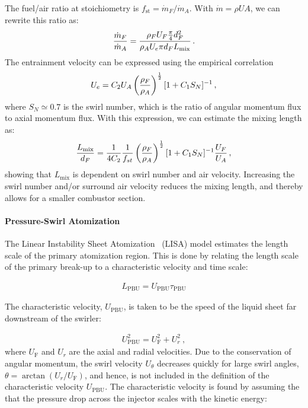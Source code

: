 The fuel/air ratio at stoichiometry is $f_\text{st} = \dot{m}_F/\dot{m}_A$. With $\dot{m} = \rho UA$, we can rewrite this ratio as:
\[
{\frac{\dot{m}_F}{\dot{m}_A}} = {\frac{\rho_F U_F {\frac{\pi}{4}} d_F^2}{\rho_A U_e \pi d_F L_\text{mix}}}\,.
\]
The entrainment velocity can be expressed using the empirical correlation
\begin{equation}
  U_e = C_2 U_A \left({\frac{\rho_F}{\rho_A}}\right)^{\frac{1}{2}} [1+C_1 S_N]^{-1}\,,
\end{equation}
where $S_N \simeq 0.7$ is the swirl number, which is the ratio of angular momentum flux to axial momentum flux. With this expression, we can estimate the mixing length as:
\begin{equation}
{\frac{L_\text{mix}}{d_F}} = {\frac{1}{4C_2}} {\frac{1}{f_{st}}} \left({\frac{\rho_F}{\rho_A}}\right)^{\frac{1}{2}}[1+C_1 S_N]^{-1} {\frac{U_F}{U_A}}\,,
\end{equation}
showing that $L_\text{mix}$ is dependent on swirl number and air velocity. Increasing the swirl number and/or surround air velocity reduces the mixing length, and thereby allows for a smaller combustor section. 

\paragraph{Pressure-Swirl Atomization}

The Linear Instability Sheet Atomization~\cite{SCHMIDT_SAE99} (LISA) model estimates the length scale of the primary atomization region. This is done by relating the length scale of the primary break-up to a characteristic velocity and time scale:

\begin{equation}
	\begin{aligned}
    	L_\mathrm{PBU}=U_\mathrm{PBU}\tau_\mathrm{PBU}
    \end{aligned}
\end{equation}

The characteristic velocity, $U_\mathrm{PBU}$, is taken to be the speed of the liquid sheet far downstream of the swirler:

\begin{equation}
	\begin{aligned}
    	U_\mathrm{PBU}^2=U_\mathrm{F}^2+U_{r}^2\ ,
    \end{aligned}
\end{equation}
where $U_\mathrm{F}$ and $U_r$ are the axial and radial velocities. Due to the conservation of angular momentum, the swirl velocity $U_\theta$ decreases quickly for large swirl angles, $\theta=\arctan\left(U_r/U_\mathrm{F}\right)$, and hence, is not included in the definition of the characteristic velocity $U_\mathrm{PBU}$. The characteristic velocity is found by assuming the that the pressure drop across the injector scales with the kinetic energy: 

